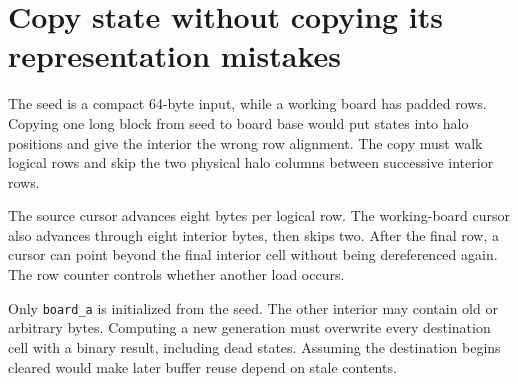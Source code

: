 \section{Copy state without copying its representation
  mistakes}\label{008-life-generations-p03-copy-state-without-copying-its-representation-mistakes}

The seed is a compact 64-byte input, while a working board has padded
rows. Copying one long block from seed to board base would put states
into halo positions and give the interior the wrong row alignment. The
copy must walk logical rows and skip the two physical halo columns
between successive interior rows.

The source cursor advances eight bytes per logical row. The
working-board cursor also advances through eight interior bytes, then
skips two. After the final row, a cursor can point beyond the final
interior cell without being dereferenced again. The row counter controls
whether another load occurs.

Only \texttt{board\_a} is initialized from the seed. The other interior
may contain old or arbitrary bytes. Computing a new generation must
overwrite every destination cell with a binary result, including dead
states. Assuming the destination begins cleared would make later buffer
reuse depend on stale contents.
